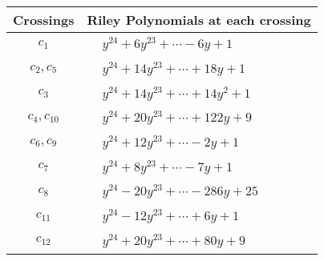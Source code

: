 \documentclass[1p]{elsarticle_modified}
\theoremstyle{definition}
\begin{document}
\begin{tabular}{m{50pt}|m{274pt}}
Crossings & \hspace{64pt}Riley Polynomials at each crossing \\
\hline $$\begin{aligned}c_{1}\end{aligned}$$&$\begin{aligned}
&y^{24}+6 y^{23}+\cdots-6 y+1
\end{aligned}$\\
\hline $$\begin{aligned}c_{2},c_{5}\end{aligned}$$&$\begin{aligned}
&y^{24}+14 y^{23}+\cdots+18 y+1
\end{aligned}$\\
\hline $$\begin{aligned}c_{3}\end{aligned}$$&$\begin{aligned}
&y^{24}+14 y^{23}+\cdots+14 y^2+1
\end{aligned}$\\
\hline $$\begin{aligned}c_{4},c_{10}\end{aligned}$$&$\begin{aligned}
&y^{24}+20 y^{23}+\cdots+122 y+9
\end{aligned}$\\
\hline $$\begin{aligned}c_{6},c_{9}\end{aligned}$$&$\begin{aligned}
&y^{24}+12 y^{23}+\cdots-2 y+1
\end{aligned}$\\
\hline $$\begin{aligned}c_{7}\end{aligned}$$&$\begin{aligned}
&y^{24}+8 y^{23}+\cdots-7 y+1
\end{aligned}$\\
\hline $$\begin{aligned}c_{8}\end{aligned}$$&$\begin{aligned}
&y^{24}-20 y^{23}+\cdots-286 y+25
\end{aligned}$\\
\hline $$\begin{aligned}c_{11}\end{aligned}$$&$\begin{aligned}
&y^{24}-12 y^{23}+\cdots+6 y+1
\end{aligned}$\\
\hline $$\begin{aligned}c_{12}\end{aligned}$$&$\begin{aligned}
&y^{24}+20 y^{23}+\cdots+80 y+9
\end{aligned}$\\
\hline
\end{tabular}\\~\\
\end{document}
